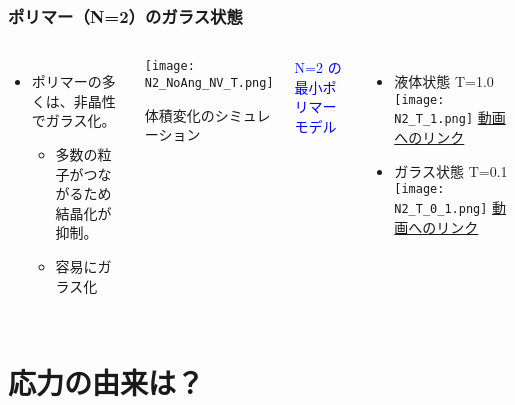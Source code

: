 \documentclass[12pt, dvipdfmx]{beamer}
\begin{document}
\begin{frame}
	\frametitle{ポリマー（N=2）のガラス状態}
		\begin{columns}[T, onlytextwidth]
				\begin{itemize}
					\item ポリマーの多くは、非晶性でガラス化。
					\begin{itemize}
						\item 多数の粒子がつながるため結晶化が抑制。
						\item 容易にガラス化
					\end{itemize}
				\end{itemize}	
				\begin{center}
					\texttt{[image: N2\_NoAng\_NV\_T.png]}

					\scriptsize{体積変化のシミュレーション}
				\end{center}
			\textcolor{blue}{N=2 の最小ポリマーモデル}
				\begin{itemize}
					\item 液体状態 T=1.0
					\texttt{[image: N2\_T\_1.png]}
					\href{https://drive.google.com/file/d/1V5lLeoqhoUcujVnHqEzFumDlGXC_rPe-/view?usp=sharing}{動画へのリンク}
					\item ガラス状態 T=0.1
					\texttt{[image: N2\_T\_0\_1.png]}
					\href{https://drive.google.com/file/d/1HBZ6eQQp0o2vft4bUGxRJUwv4vabs_7d/view?usp=sharing}{動画へのリンク}
				\end{itemize}
		\end{columns}
\end{frame}

\section{応力の由来は？}
\end{document}
